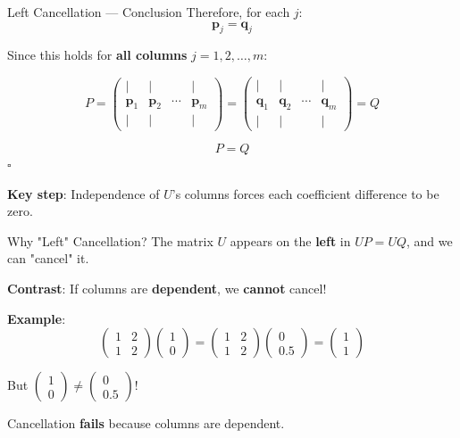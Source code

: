 \documentclass[10pt]{beamer}
\theoremstyle{definition}
\newcommand{\x}[1]{\alert{\textbf{#1}}}
\begin{document}
\begin{frame}{Left Cancellation — Conclusion}
Therefore, for each $j$:
$$\mathbf{p}_j = \mathbf{q}_j$$

\vfill
Since this holds for \x{all columns} $j = 1, 2, \ldots, m$:

$$P = \begin{pmatrix} | & | & & | \\ \mathbf{p}_1 & \mathbf{p}_2 & \cdots & \mathbf{p}_m \\ | & | & & | \end{pmatrix} = \begin{pmatrix} | & | & & | \\ \mathbf{q}_1 & \mathbf{q}_2 & \cdots & \mathbf{q}_m \\ | & | & & | \end{pmatrix} = Q$$

\vfill
$$\boxed{P = Q}$$ $\square$

\vfill
\x{Key step}: Independence of $U$'s columns forces each coefficient difference to be zero.
\end{frame}

\begin{frame}{Why "Left" Cancellation?}
The matrix $U$ appears on the \x{left} in $UP = UQ$, and we can "cancel" it.

\vfill
\x{Contrast}: If columns are \x{dependent}, we \x{cannot} cancel!

\vfill
\textbf{Example}:
$$\begin{pmatrix} 1 & 2 \\ 1 & 2 \end{pmatrix}\begin{pmatrix} 1 \\ 0 \end{pmatrix} = \begin{pmatrix} 1 & 2 \\ 1 & 2 \end{pmatrix}\begin{pmatrix} 0 \\ 0.5 \end{pmatrix} = \begin{pmatrix} 1 \\ 1 \end{pmatrix}$$

But $\begin{pmatrix} 1 \\ 0 \end{pmatrix} \neq \begin{pmatrix} 0 \\ 0.5 \end{pmatrix}$!

Cancellation \x{fails} because columns are dependent.
\end{frame}
\end{document}
